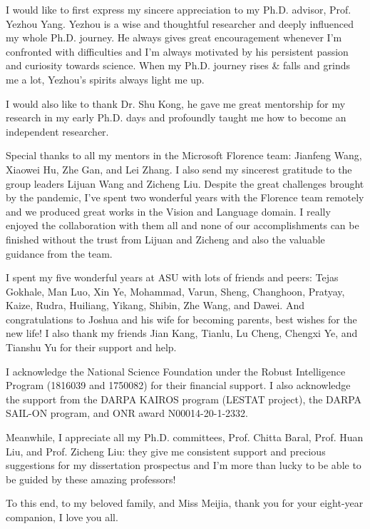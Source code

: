 I would like to first express my sincere appreciation to my Ph.D. advisor, Prof. Yezhou Yang. Yezhou is a wise and thoughtful researcher and deeply influenced my whole Ph.D. journey. He always gives great encouragement whenever I'm confronted with difficulties and I'm always motivated by his persistent passion and curiosity towards science. When my Ph.D.  journey rises \& falls and grinds me a lot, Yezhou's spirits always light me up. 

I would also like to thank Dr. Shu Kong, he gave me great mentorship for my research in my early Ph.D. days and profoundly taught me how to become an independent researcher.

Special thanks to all my mentors in the Microsoft Florence team: Jianfeng Wang, Xiaowei Hu, Zhe Gan, and Lei Zhang. I also send my sincerest gratitude to the group leaders Lijuan Wang and Zicheng Liu. Despite the great challenges brought by the pandemic, I've spent two wonderful years with the Florence team remotely and we produced great works in the Vision and Language domain. I really enjoyed the collaboration with them all and none of our accomplishments can be finished without the trust from Lijuan and Zicheng and also the valuable guidance from the team.

I spent my five wonderful years at ASU with lots of friends and peers: Tejas Gokhale, Man Luo, Xin Ye, Mohammad, Varun, Sheng, Changhoon, Pratyay, Kaize, Rudra, Huiliang, Yikang, Shibin, Zhe Wang, and Dawei. And congratulations to Joshua and his wife for becoming parents, best wishes for the new life! I also thank my friends Jian Kang, Tianlu, Lu Cheng, Chengxi Ye, and Tianshu Yu for their support and help.

I acknowledge the National Science Foundation under the Robust Intelligence Program
(1816039 and 1750082) for their financial support. I also acknowledge the support from the DARPA KAIROS program (LESTAT project), the DARPA SAIL-ON program, and ONR award N00014-20-1-2332.

Meanwhile, I appreciate all my Ph.D. committees, Prof. Chitta Baral, Prof. Huan Liu, and Prof. Zicheng Liu: they give me consistent support and precious suggestions for my dissertation prospectus and I'm more than lucky to be able to be guided by these amazing professors!

To this end, to my beloved family, and Miss Meijia, thank you for your eight-year companion, I love you all.

